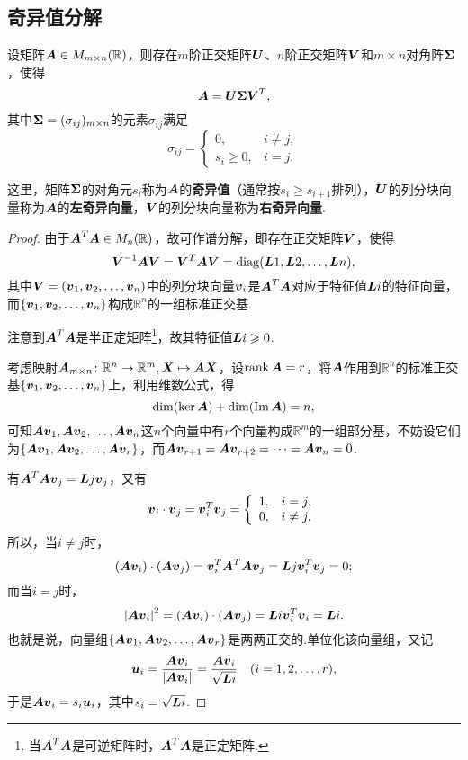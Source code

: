\subsection{奇异值分解}
\begin{theorem}
\def\U{\mat{U}}
\def\S{\mat{\Sigma}}
\def\V{\mat{V}}
\let\Q\V
\let\P\U
\def\p{\mat{u}}
\def\q{\mat{v}}
设矩阵\(\boldsymbol{A} \in M_{m \times n}(\mathbb{R})\)，则存在\(m\)阶正交矩阵\(\U\)、\(n\)阶正交矩阵\(\V\)和\(m \times n\)对角阵\(\S\)，使得\[
\A = \U \S \V^T,
\]其中\(\S = (\sigma_{ij})_{m \times n}\)的元素\(\sigma_{ij}\)满足\[
\sigma_{ij} = \left\{ \begin{array}{cc}
0, & i \neq j, \\
s_i \geqslant 0, & i = j.
\end{array} \right.
\]

这里，矩阵\(\S\)的对角元\(s_i\)称为\(\boldsymbol{A}\)的\textbf{奇异值}（通常按\(s_i \geqslant s_{i+1}\)排列），\(\U\)的列分块向量称为\(\boldsymbol{A}\)的\textbf{左奇异向量}，\(\V\)的列分块向量称为\textbf{右奇异向量}.
\begin{proof}
由于\(\boldsymbol{A}^T \boldsymbol{A} \in M_n(\mathbb{R})\)，故可作谱分解，即存在正交矩阵\(\Q\)，使得\[
\Q^{-1}\A\Q = \Q^T\A\Q = \diag(\L{1},\L{2},\dotsc,\L{n}),
\]其中\(\Q=(\q_1,\q_2,\dotsc,\q_n)\)中的列分块向量\(\q_i\)是\(\boldsymbol{A}^T \boldsymbol{A}\)对应于特征值\(\boldsymbol{L}{i}\)的特征向量，而\(\{\q_1,\q_2,\dotsc,\q_n\}\)构成\(\mathbb{R}^n\)的一组标准正交基.

注意到\(\boldsymbol{A}^T \boldsymbol{A}\)是半正定矩阵\footnote{当\(\boldsymbol{A}^T \boldsymbol{A}\)是可逆矩阵时，\(\boldsymbol{A}^T \boldsymbol{A}\)是正定矩阵.}，故其特征值\(\boldsymbol{L}{i}\geqslant0\).

考虑映射\(\boldsymbol{A}_{m \times n}\colon \mathbb{R}^n \to \mathbb{R}^m, \boldsymbol{X} \mapsto \boldsymbol{A}\boldsymbol{X}\)，设\(\rank\boldsymbol{A} = r\)，将\(\boldsymbol{A}\)作用到\(\mathbb{R}^n\)的标准正交基\(\{\q_1,\q_2,\dotsc,\q_n\}\)上，利用维数公式，得\[
\dim(\ker \boldsymbol{A}) + \dim(\Im \boldsymbol{A}) = n,
\]可知\(\A\q_1,\A\q_2,\dotsc,\A\q_n\)这\(n\)个向量中有\(r\)个向量构成\(\mathbb{R}^m\)的一组部分基，不妨设它们为\(\{\A\q_1,\A\q_2,\dotsc,\A\q_r\}\)，而\(\A\q_{r+1} = \A\q_{r+2} = \dotsb = \A\q_n = 0\).

有\(\A^T \A \q_j = \L{j} \q_j\)，又有\[
\q_i \cdot \q_j = \q_i^T \q_j
= \left\{ \begin{array}{lc}
1, & i=j, \\
0, & i \neq j.
\end{array} \right.
\]所以，当\(i \neq j\)时，\[
(\A\q_i)\cdot(\A\q_j) = \q_i^T \A^T \A \q_j = \L{j} \q_i^T \q_j = 0;
\]而当\(i = j\)时，\[
\abs{\A\q_i}^2 = (\A\q_i)\cdot(\A\q_j) = \L{i} \q_i^T \q_i = \L{i}.
\]也就是说，向量组\(\{\A\q_1,\A\q_2,\dotsc,\A\q_r\}\)是两两正交的.单位化该向量组，又记\[
\p_i = \frac{\A\q_i}{\abs{\A\q_i}}
= \frac{\A\q_i}{\sqrt{\L{i}}}
\quad(i=1,2,\dotsc,r),
\]于是\(\A\q_i = s_i \p_i\)，其中\(s_i = \sqrt{\boldsymbol{L}{i}}\).


\end{proof}
\end{theorem}
